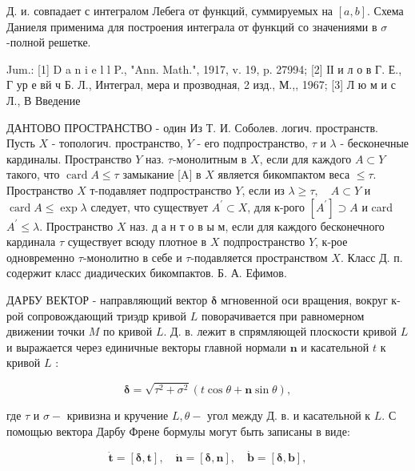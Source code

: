 \documentclass[10pt]{article}
\begin{document}
Д. и. совпадает с интегралом Лебега от функций, суммируемых на $[a, b]$. Схема Даниеля применима для построения интеграла от функций со значениями в $\sigma$-полной решетке.



Jum.: [1] D a n i e l l P., "Ann. Math.", 1917, v. 19, p. 27994; [2] ІІ и л о в Г. Е., Г ур е вй ч Б. Л., Интеграл, мера и прозводная, 2 изд., М.,, 1967; [3] Л ю м и с Л., В Введение



ДАНТОВО ПРОСТРАНСТВО - один Из Т. И. Соболев. логич. пространств. Пусть $X$ - топологич. пространство, $Y$ - его подпространство, $\tau$ и $\lambda$ - бесконечные кардиналы. Пространство $Y$ наз. $\tau$-монолитным в $X$, если для каждого $A \subset Y$ такого, что $\operatorname{card} A \leqslant \tau$ замыкание [A] в $X$ является бикомпактом веса $\leqslant \tau$. Пространство $X$ т-подавляет подпространство $Y$, если из $\lambda \geqslant \tau, \quad A \subset Y$ и $\operatorname{card} A \leqslant \exp \lambda$ следует, что существует $A^{\prime} \subset X$, для к-рого $\left[A^{\prime}\right] \supset A$ и card $A^{\prime} \leqslant \lambda$. Пространство $X$ наз. д а н т о в ы м, если для каждого бесконечного кардинала $\tau$ существует всюду плотное в $X$ подпространство $Y$, к-рое одновременно $\tau$-монолитно в себе и $\tau$-подавляется пространством $X$. Класс Д. п. содержит класс диадических бикомпактов. Б. А. Ефимов.



ДАРБУ ВЕКТОР - направляющий вектор $\boldsymbol{\delta}$ мгновенной оси вращения, вокруг к-рой сопровождающий триэдр кривой $L$ поворачивается при равномерном движении точки $M$ по кривой $L$. Д. в. лежит в спрямляющей плоскости кривой $L$ и выражается через единичные векторы главной нормали $\boldsymbol{n}$ и касательной $t$ к кривой $L$ :



\[

\boldsymbol{\delta}=\sqrt{\tau^{2}+\sigma^{2}}(t \cos \theta+\boldsymbol{n} \sin \theta),

\]



где $\tau$ и $\sigma-$ кривизна и кручение $L, \theta-$ угол между Д. в. и касательной к $L$. С помощью вектора Дарбу Френе бормулы могут быть записаны в виде:



\[

\dot{\boldsymbol{t}}=[\boldsymbol{\delta}, \boldsymbol{t}], \quad \dot{\boldsymbol{n}}=[\boldsymbol{\delta}, \boldsymbol{n}], \quad \dot{\boldsymbol{b}}=[\boldsymbol{\delta}, \boldsymbol{b}],

\]
\end{document}
